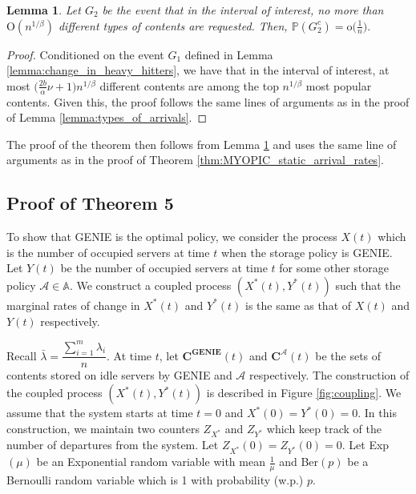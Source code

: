 \documentclass[10pt, conference, letterpaper]{IEEEtran}
\newtheorem{lemma}{Lemma}
\def \OO {\mathrm{O}}
\def \oo {\mathrm{o}}
\begin{document}
\begin{lemma}
	\label{lemma:types_of_arrivals_changing_arrival_rates}
	Let $G_2$ be the event that in the interval of interest, no more than $\OO(n^{1/\beta})$ different types of contents are requested. Then,
	$
	\mathbb{P}(G_2^c) = \oo\big(\frac{1}{n}\big).
	$
\end{lemma}
\begin{proof}
	Conditioned on the event $G_1$ defined in Lemma \ref{lemma:change_in_heavy_hitters}, we have that in the interval of interest, at most $\big(\frac{2b}{\alpha} \nu + 1\big)n^{1/\beta}$ different contents are among the top $n^{1/\beta}$ most popular contents. Given this, the proof follows the same lines of arguments as in the proof of Lemma \ref{lemma:types_of_arrivals}.
\end{proof}
The proof of the theorem then follows from Lemma \ref{lemma:types_of_arrivals_changing_arrival_rates} and uses the same line of arguments as in the proof of Theorem \ref{thm:MYOPIC_static_arrival_rates}.





\subsection{Proof of Theorem 5}
\label{sec:proof1}

To show that GENIE is the optimal policy, we consider the process $X(t)$ which is the number of occupied servers at time $t$ when the storage policy is GENIE. Let $Y(t)$ be the number of occupied servers at time $t$ for some other storage policy $\mathcal{A} \in \mathds{A}$. We construct a coupled process $(X^*(t),Y^*(t))$ such that the marginal rates of change in $X^*(t)$ and $Y^*(t)$ is the same as that of $X(t)$ and $Y(t)$ respectively.

Recall $\bar{\lambda} = \dfrac{\sum_{i=1}^m \lambda_i}{n}$. At time $t$, let $\mathbf{C^{GENIE}}(t)$ and $\mathbf{C^{\mathcal{A}}}(t)$ be the sets of contents stored on idle servers by GENIE and $\mathcal{A}$ respectively. The construction of the coupled process $(X^*(t),Y^*(t))$ is described in Figure \ref{fig:coupling}. We assume that the system starts at time $t=0$ and $X^*(0) = Y^*(0) = 0$. In this construction, we maintain two counters $Z_{X^*}$ and $Z_{Y^*}$ which keep track of the number of departures from the system. Let $Z_{X^*}(0) = Z_{Y^*}(0) = 0$. Let Exp$(\mu)$ be an Exponential random variable with mean $\frac{1}{\mu}$ and Ber$(p)$ be a Bernoulli random variable which is 1 with probability (w.p.) $p$.
\end{document}
